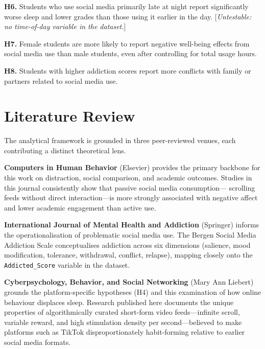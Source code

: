 \documentclass[10pt]{article}
\begin{document}
\medskip
\noindent\textbf{H6.} Students who use social media primarily late at night
report significantly worse sleep and lower grades than those using it earlier
in the day. [\textit{Untestable: no time-of-day variable in the dataset.}]

\medskip
\noindent\textbf{H7.} Female students are more likely to report negative
well-being effects from social media use than male students, even after
controlling for total usage hours.

\medskip
\noindent\textbf{H8.} Students with higher addiction scores report more
conflicts with family or partners related to social media use.

\section{Literature Review}

The analytical framework is grounded in three peer-reviewed venues, each
contributing a distinct theoretical lens.

\textbf{Computers in Human Behavior} (Elsevier) provides the primary backbone
for this work on distraction, social comparison, and academic outcomes. Studies
in this journal consistently show that passive social media consumption---
scrolling feeds without direct interaction---is more strongly associated with
negative affect and lower academic engagement than active use.

\textbf{International Journal of Mental Health and Addiction} (Springer) informs
the operationalisation of problematic social media use. The Bergen Social Media
Addiction Scale conceptualises addiction across six dimensions (salience, mood
modification, tolerance, withdrawal, conflict, relapse), mapping closely onto
the \texttt{Addicted\_Score} variable in the dataset.

\textbf{Cyberpsychology, Behavior, and Social Networking} (Mary Ann Liebert)
grounds the platform-specific hypotheses (H4) and this examination of how online
behaviour displaces sleep. Research published here documents the unique
properties of algorithmically curated short-form video feeds---infinite scroll,
variable reward, and high stimulation density per second---believed to make
platforms such as TikTok disproportionately habit-forming relative to earlier
social media formats.

\end{document}
